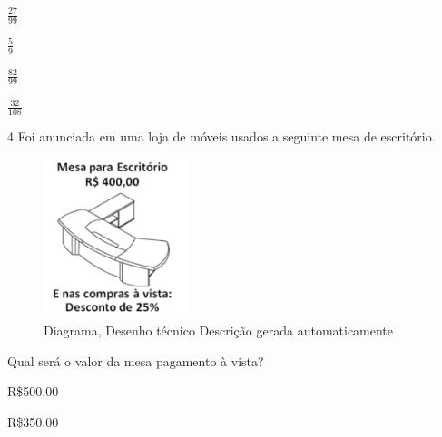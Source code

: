 {{{\begin{escolha}
{{{{\begin{escolha}
\begin{escolha}
{\begin{escolha}
\begin{escolha}
\begin{escolha}
\begin{escolha}
\begin{escolha}
\begin{escolha}
\begin{escolha}

\item $\frac{27}{99}$

\item $\frac{5}{9}$

\item $\frac{82}{99}$

\item $\frac{32}{108}$

\end{escolha}


\num{4} Foi anunciada em uma loja de móveis usados a seguinte mesa de
escritório.

\begin{figure}
\centering
\includegraphics[width=1.66071in,height=1.8286in]{./_SAEB_9_MAT/media/image262.png}
\caption{Diagrama, Desenho técnico Descrição gerada automaticamente}
\end{figure}


Qual será o valor da mesa pagamento à vista?

\begin{escolha}

\item R\$500,00

\item R\$350,00


\end{escolha}
\end{escolha}
\end{escolha}
\end{escolha}
\end{escolha}
\end{escolha}
\end{escolha}}
\end{escolha}
\end{escolha}}}}}
\end{escolha}}}}
